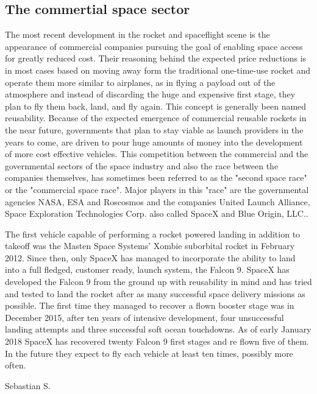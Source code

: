 \subsection{The commertial space sector}

The most recent development in the rocket and spaceflight scene is the appearance of commercial companies pursuing the goal of enabling space access for greatly reduced cost. Their reasoning behind the expected price reductions is in most cases based on moving away form the traditional one-time-use rocket and operate them more similar to airplanes, as in flying a payload out of the atmosphere and instead of discarding the huge and expensive first stage, they plan to fly them back, land, and fly again. This concept is generally been named reusability. Because of the expected emergence of commercial reusable rockets in the near future, governments that plan to stay viable as launch providers in the years to come, are driven to pour huge amounts of money into the development of more cost effective vehicles. This competition between the commercial and the governmental sectors of the space industry and also the race between the companies themselves, has sometimes been referred to as the "second space race" or the "commercial space race". Major players in this "race" are the governmental agencies NASA, ESA and Roscosmos and the companies United Launch Alliance, Space Exploration Technologies Corp. also called SpaceX and Blue Origin, LLC..

The first vehicle capable of performing a rocket powered landing in addition to takeoff was the Masten Space Systems' Xombie suborbital rocket in February 2012. Since then, only SpaceX has managed to incorporate the ability to land into a full fledged, customer ready, launch system, the Falcon 9. SpaceX has developed the Falcon 9 from the ground up with reusability in mind and has tried and tested to land the rocket after as many successful space delivery missions as possible. The first time they managed to recover a flown booster stage was in December 2015, after ten years of intensive development, four unsuccessful landing attempts and three successful soft ocean touchdowns. As of early January 2018 SpaceX has recovered twenty Falcon 9 first stages and re flown five of them. In the future they expect to fly each vehicle at least ten times, possibly more often.







Sebastian S.
